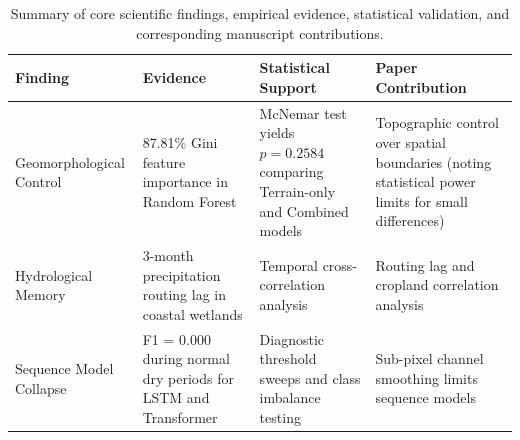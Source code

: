 \begin{table}[t]
\caption{Summary of core scientific findings, empirical evidence, statistical validation, and corresponding manuscript contributions.}
\label{tab:contribution_summary}
\centering
\small
\begin{tabular}{p{2.8cm} p{2.8cm} p{4.0cm} p{2.8cm}}
\hline
\textbf{Finding} & \textbf{Evidence} & \textbf{Statistical Support} & \textbf{Paper Contribution} \\
\hline
Geomorphological Control & 87.81\% Gini feature importance in Random Forest & McNemar test yields $p = 0.2584$ comparing Terrain-only and Combined models & Topographic control over spatial boundaries (noting statistical power limits for small differences) \\
\hline
Hydrological Memory & 3-month precipitation routing lag in coastal wetlands & Temporal cross-correlation analysis & Routing lag and cropland correlation analysis \\
\hline
Sequence Model Collapse & F1 = 0.000 during normal dry periods for LSTM and Transformer & Diagnostic threshold sweeps and class imbalance testing & Sub-pixel channel smoothing limits sequence models \\
\hline
\end{tabular}
\end{table}
